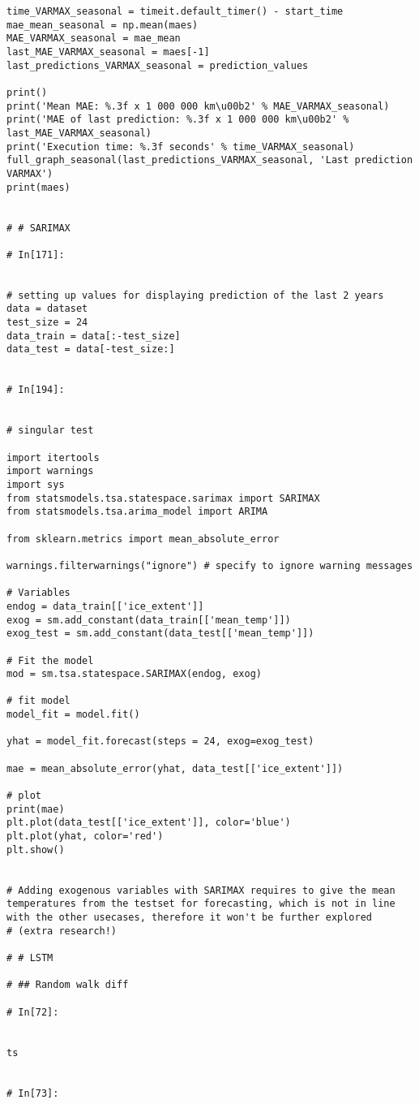 \begin{verbatim}
time_VARMAX_seasonal = timeit.default_timer() - start_time
mae_mean_seasonal = np.mean(maes)
MAE_VARMAX_seasonal = mae_mean
last_MAE_VARMAX_seasonal = maes[-1]
last_predictions_VARMAX_seasonal = prediction_values

print()
print('Mean MAE: %.3f x 1 000 000 km\u00b2' % MAE_VARMAX_seasonal)
print('MAE of last prediction: %.3f x 1 000 000 km\u00b2' % last_MAE_VARMAX_seasonal)
print('Execution time: %.3f seconds' % time_VARMAX_seasonal)
full_graph_seasonal(last_predictions_VARMAX_seasonal, 'Last prediction VARMAX')
print(maes)


# # SARIMAX

# In[171]:


# setting up values for displaying prediction of the last 2 years
data = dataset
test_size = 24
data_train = data[:-test_size]
data_test = data[-test_size:]


# In[194]:


# singular test

import itertools
import warnings
import sys
from statsmodels.tsa.statespace.sarimax import SARIMAX
from statsmodels.tsa.arima_model import ARIMA

from sklearn.metrics import mean_absolute_error

warnings.filterwarnings("ignore") # specify to ignore warning messages

# Variables
endog = data_train[['ice_extent']]
exog = sm.add_constant(data_train[['mean_temp']])
exog_test = sm.add_constant(data_test[['mean_temp']])

# Fit the model
mod = sm.tsa.statespace.SARIMAX(endog, exog)

# fit model
model_fit = model.fit()

yhat = model_fit.forecast(steps = 24, exog=exog_test)

mae = mean_absolute_error(yhat, data_test[['ice_extent']])

# plot
print(mae)
plt.plot(data_test[['ice_extent']], color='blue')
plt.plot(yhat, color='red')
plt.show()


# Adding exogenous variables with SARIMAX requires to give the mean temperatures from the testset for forecasting, which is not in line with the other usecases, therefore it won't be further explored
# (extra research!)

# # LSTM

# ## Random walk diff

# In[72]:


ts


# In[73]:



\end{verbatim}
